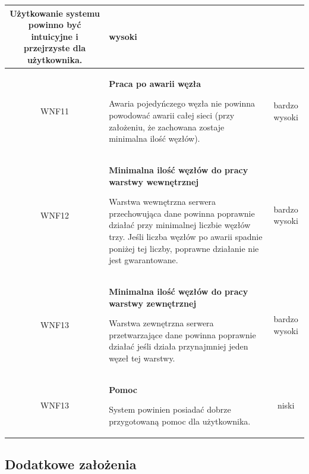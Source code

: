 \begin{tabularx}{\textwidth}{|c|X|c|}
Użytkowanie systemu powinno być intuicyjne i przejrzyste dla użytkownika.
 & wysoki\\
\hline

\label{z:WNF11} WNF11 & \textbf{Praca po awarii węzła} 
 
Awaria pojedyńczego węzła nie powinna powodować awarii całej sieci (przy założeniu, że zachowana zostaje minimalna ilość węzłów).
 & bardzo wysoki\\
\hline

\label{z:WNF12} WNF12 & \textbf{Minimalna ilość węzłów do pracy warstwy wewnętrznej} 
 
Warstwa wewnętrzna serwera przechowująca dane powinna poprawnie działać przy minimalnej liczbie węzłów trzy. Jeśli liczba węzłów po awarii spadnie poniżej tej liczby, poprawne działanie nie jest gwarantowane.
 & bardzo wysoki\\
\hline

\label{z:WNF13} WNF13 & \textbf{Minimalna ilość węzłów do pracy warstwy zewnętrznej} 
 
Warstwa zewnętrzna serwera przetwarzające dane powinna poprawnie działać jeśli działa przynajmniej jeden węzeł tej warstwy.
 & bardzo wysoki\\
\hline

\label{z:WNF13} WNF13 & \textbf{Pomoc} 
 
System powinien posiadać dobrze przygotowaną pomoc dla użytkownika.
 & niski \\
\hline

\end{tabularx}


\subsection[Dodatkowe założenia]{Dodatkowe założenia}

